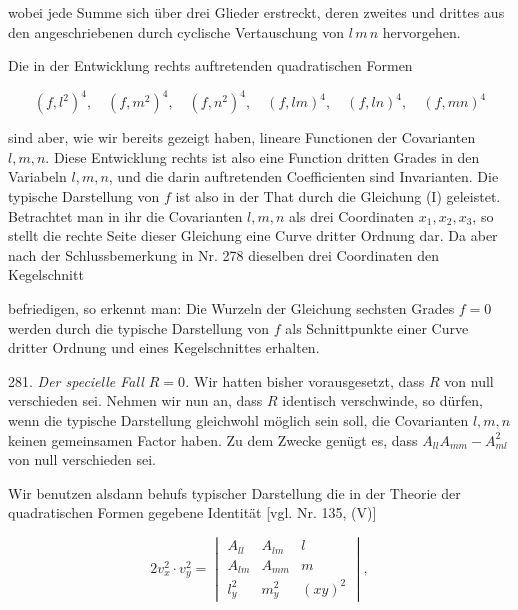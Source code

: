 wobei jede Summe sich über drei Glieder erstreckt, deren zweites und drittes aus den angeschriebenen durch cyclische Vertauschung von $l\, m\, n$ hervorgehen.

Die in der Entwicklung rechts auftretenden quadratischen Formen

\[
(f, l^2)^4,\quad (f, m^2)^4,\quad (f, n^2)^4,\quad (f, lm)^4,\quad (f, ln)^4,\quad (f, mn)^4
\]

sind aber, wie wir bereits gezeigt haben, lineare Functionen der Covarianten $l, m, n$. Diese Entwicklung rechts ist also eine Function dritten Grades in den Variabeln $l, m, n$, und die darin auftretenden Coefficienten sind Invarianten. Die typische Darstellung von $f$ ist also in der That durch die Gleichung (I) geleistet. Betrachtet man in ihr die Covarianten $l, m, n$ als drei Coordinaten $x_1, x_2, x_3$, so stellt die rechte Seite dieser Gleichung eine Curve dritter Ordnung dar. Da aber nach der Schlussbemerkung in Nr. 278 dieselben drei Coordinaten den Kegelschnitt


befriedigen, so erkennt man: Die Wurzeln der Gleichung sechsten Grades $f = 0$ werden durch die typische Darstellung von $f$ als Schnittpunkte einer Curve dritter Ordnung und eines Kegelschnittes erhalten.

281. \textit{Der specielle Fall $R = 0$.} Wir hatten bisher vorausgesetzt, dass $R$ von null verschieden sei. Nehmen wir nun an, dass $R$ identisch verschwinde, so dürfen, wenn die typische Darstellung gleichwohl möglich sein soll, die Covarianten $l, m, n$ keinen gemeinsamen Factor haben. Zu dem Zwecke genügt es, dass $A_{ll}A_{mm} - A_{ml}^2$ von null verschieden sei.

Wir benutzen alsdann behufs typischer Darstellung die in der Theorie der quadratischen Formen gegebene Identität [vgl. Nr. 135, (V)]

\[
2v_x^2 \cdot v_y^2 =
\begin{vmatrix}
A_{ll} & A_{lm} & l \\
A_{lm} & A_{mm} & m \\
l_y^2 & m_y^2 & (xy)^2
\end{vmatrix},
\]

